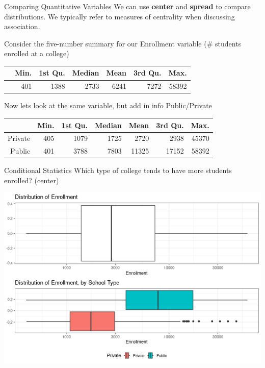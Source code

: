 \documentclass{beamer}
\begin{document}
\begin{frame}{Comparing Quantitative Variables}
We can use \textbf{center} and \textbf{spread} to compare distributions. We typically refer to measures of centrality when discussing association. \vspace{3mm}


Consider the five-number summary for our Enrollment variable ($\#$ students enrolled at a college)
\begin{table}[ht]
\centering
\begin{tabular}{rrrrrrr}
  \hline
 & Min. & 1st Qu. & Median & Mean & 3rd Qu. & Max. \\ 
  \hline
 & 401 & 1388 & 2733 & 6241 & 7272 & 58392 \\ 
   \hline
\end{tabular}
\end{table}
\vspace{3mm}

Now lets look at the same variable, but add in info Public/Private
\begin{table}[ht]
\centering
\begin{tabular}{rrrrrrr}
  \hline
 & Min. & 1st Qu. & Median & Mean & 3rd Qu. & Max. \\ 
  \hline
Private & 405 & 1079 & 1725 & 2720 & 2938 & 45370 \\ 
  Public & 401 & 3788 & 7803 & 11325 & 17152 & 58392 \\ 
   \hline
\end{tabular}
\end{table}
\end{frame}



\begin{frame}{Conditional Statistics}
Which type of college tends to have more students enrolled? (center)
\begin{center}
\includegraphics[scale=0.5]{enrollment_conditional.png}
\end{center}
\end{frame}
\end{document}
